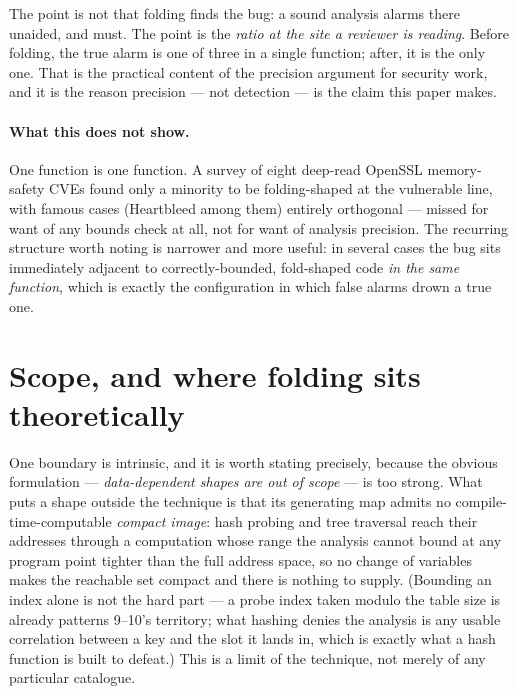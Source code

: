 \documentclass[11pt,a4paper]{article}
\begin{document}
The point is not that folding finds the bug: a sound analysis alarms there unaided, and
must. The point is the \emph{ratio at the site a reviewer is reading}. Before folding,
the true alarm is one of three in a single function; after, it is the only one. That is
the practical content of the precision argument for security work, and it is the reason
precision --- not detection --- is the claim this paper makes.

\paragraph{What this does not show.} One function is one function. A survey of eight
deep-read OpenSSL memory-safety CVEs found only a minority to be folding-shaped at the
vulnerable line, with famous cases (Heartbleed among them) entirely orthogonal --- missed
for want of any bounds check at all, not for want of analysis precision. The recurring
structure worth noting is narrower and more useful: in several cases the bug sits
immediately adjacent to correctly-bounded, fold-shaped code \emph{in the same function},
which is exactly the configuration in which false alarms drown a true one.

\section{Scope, and where folding sits theoretically}
\label{sec:theory}

One boundary is intrinsic, and it is worth stating precisely, because the obvious
formulation --- \emph{data-dependent shapes are out of scope} --- is too strong. What
puts a shape outside the technique is that its generating map admits no
compile-time-computable \emph{compact image}: hash probing and tree traversal reach
their addresses through a computation whose range the analysis cannot bound at any
program point tighter than the full address space, so no change of variables makes the
reachable set compact and there is nothing to supply. (Bounding an index alone is not
the hard part --- a probe index taken modulo the table size is already patterns 9--10's
territory; what hashing denies the analysis is any usable correlation between a key and
the slot it lands in, which is exactly what a hash function is built to defeat.) This is
a limit of the technique, not merely of any particular catalogue.
\end{document}
